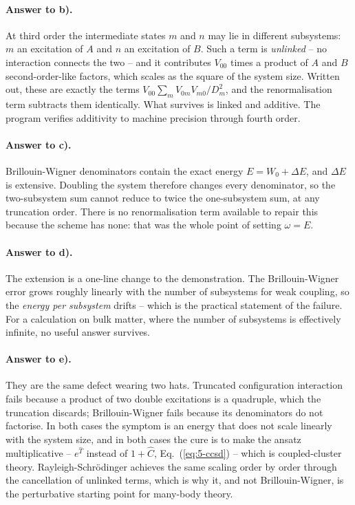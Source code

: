 \paragraph{Answer to b).}
At third order the intermediate states $m$ and $n$ may lie in different
subsystems: $m$ an excitation of $A$ and $n$ an excitation of $B$.  Such a
term is \emph{unlinked} -- no interaction connects the two -- and it
contributes $V_{00}$ times a product of $A$ and $B$ second-order-like
factors, which scales as the square of the system size.  Written out, these
are exactly the terms
$V_{00}\sum_m V_{0m}V_{m0}/D_m^2$, and the renormalisation term subtracts
them identically.  What survives is linked and additive.  The program
verifies additivity to machine precision through fourth order.

\paragraph{Answer to c).}
Brillouin-Wigner denominators contain the exact energy $E=W_0+\Delta E$, and
$\Delta E$ is extensive.  Doubling the system therefore changes every
denominator, so the two-subsystem sum cannot reduce to twice the
one-subsystem sum, at any truncation order.  There is no renormalisation term
available to repair this because the scheme has none: that was the whole
point of setting $\omega=E$.

\paragraph{Answer to d).}
The extension is a one-line change to the demonstration.  The
Brillouin-Wigner error grows roughly linearly with the number of subsystems
for weak coupling, so the \emph{energy per subsystem} drifts -- which is the
practical statement of the failure.  For a calculation on bulk matter,
where the number of subsystems is effectively infinite, no useful answer
survives.

\paragraph{Answer to e).}
They are the same defect wearing two hats.  Truncated configuration
interaction fails because a product of two double excitations is a
quadruple, which the truncation discards; Brillouin-Wigner fails because its
denominators do not factorise.  In both cases the symptom is an energy that
does not scale linearly with the system size, and in both cases the cure is
to make the ansatz multiplicative -- $e^{\hat{T}}$ instead of $1+\hat{C}$,
Eq.~(\ref{eq:5-ccsd}) -- which is coupled-cluster theory.  Rayleigh-Schr\"odinger
achieves the same scaling order by order through the cancellation of unlinked
terms, which is why it, and not Brillouin-Wigner, is the perturbative
starting point for many-body theory.

